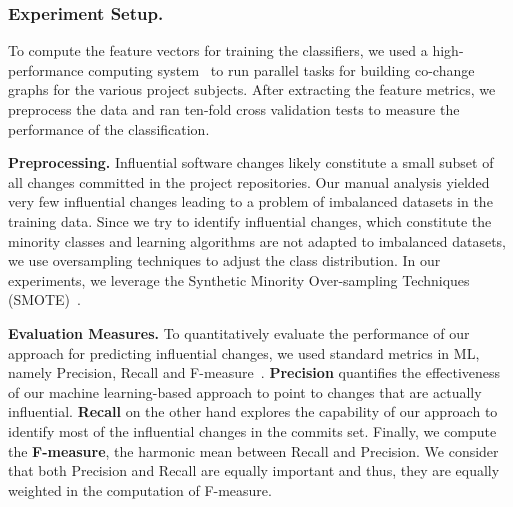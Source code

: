 \subsubsection{Experiment Setup.}\label{sec:experiment}
To compute the feature vectors for training the classifiers, we used 
a high-performance computing system~\cite{VBCG_HPCS14} to run parallel tasks for
building co-change graphs for the various project subjects. After extracting the
feature metrics, we preprocess the data and ran ten-fold cross validation
tests to measure the performance of the classification.

\textbf{Preprocessing.}
Influential software changes likely constitute a small subset of all changes
committed in the project repositories. Our manual analysis yielded very few
influential changes leading to a problem of imbalanced datasets in the training
data.
Since we try to identify influential changes, which constitute the minority
classes and learning algorithms are not adapted to imbalanced datasets, we use oversampling
techniques to adjust the class distribution. In our experiments, we leverage
the Synthetic Minority Over-sampling Techniques (SMOTE)~\cite{al.2002}.

\textbf{Evaluation Measures.}
To quantitatively evaluate the performance of our approach for predicting influential changes,
we used standard metrics in ML, namely Precision, Recall and
F-measure~\cite{mlbook,kim_classifying_2008,stat2}. {\bf Precision} quantifies the effectiveness of our machine learning-based approach to point to changes that are actually influential. {\bf Recall} on the other hand explores the capability of our approach to identify most of the influential changes in the commits set. Finally, we compute the {\bf F-measure}, the harmonic mean between Recall and Precision. We consider that both Precision and Recall are equally important and thus, they are equally weighted in the computation of F-measure.


